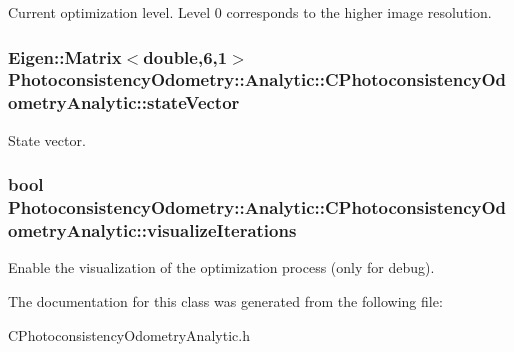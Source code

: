\label{class_photoconsistency_odometry_1_1_analytic_1_1_c_photoconsistency_odometry_analytic_a52b80772f2fabe73161055dc84ce2687}
Current optimization level. Level 0 corresponds to the higher image resolution. \hypertarget{class_photoconsistency_odometry_1_1_analytic_1_1_c_photoconsistency_odometry_analytic_a46fc9664879ed9582eb173709fba3924}{
\subsubsection[{stateVector}]{\setlength{\rightskip}{0pt plus 5cm}Eigen::Matrix$<$double,6,1$>$ {\bf PhotoconsistencyOdometry::Analytic::CPhotoconsistencyOdometryAnalytic::stateVector}}}
\label{class_photoconsistency_odometry_1_1_analytic_1_1_c_photoconsistency_odometry_analytic_a46fc9664879ed9582eb173709fba3924}
State vector. \hypertarget{class_photoconsistency_odometry_1_1_analytic_1_1_c_photoconsistency_odometry_analytic_a100c9755e220fe7cc1cdba95211fb506}{
\subsubsection[{visualizeIterations}]{\setlength{\rightskip}{0pt plus 5cm}bool {\bf PhotoconsistencyOdometry::Analytic::CPhotoconsistencyOdometryAnalytic::visualizeIterations}}}
\label{class_photoconsistency_odometry_1_1_analytic_1_1_c_photoconsistency_odometry_analytic_a100c9755e220fe7cc1cdba95211fb506}
Enable the visualization of the optimization process (only for debug). 

The documentation for this class was generated from the following file:\begin{DoxyCompactItemize}
\item 
CPhotoconsistencyOdometryAnalytic.h\end{DoxyCompactItemize}
